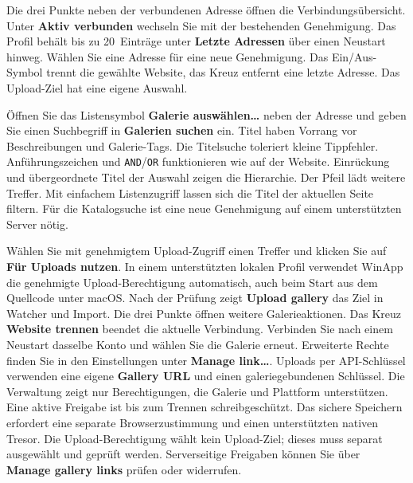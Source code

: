 \documentclass[11pt,a4paper]{article}
\newcommand{\ui}[1]{\textbf{#1}}
\begin{document}
Die drei Punkte neben der verbundenen Adresse öffnen die Verbindungsübersicht.
Unter \ui{Aktiv verbunden} wechseln Sie mit der bestehenden Genehmigung.
Das Profil behält bis zu 20~Einträge unter \ui{Letzte Adressen} über einen
Neustart hinweg. Wählen Sie eine Adresse für eine neue Genehmigung.
Das Ein/Aus-Symbol trennt die gewählte Website, das Kreuz entfernt eine
letzte Adresse. Das Upload-Ziel hat eine eigene Auswahl.

Öffnen Sie das Listensymbol \ui{Galerie auswählen…} neben der Adresse und geben
Sie einen Suchbegriff in \ui{Galerien suchen} ein. Titel haben Vorrang vor
Beschreibungen und Galerie-Tags. Die Titelsuche toleriert kleine Tippfehler.
Anführungszeichen und \texttt{AND}/\texttt{OR} funktionieren wie auf der
Website. Einrückung und übergeordnete Titel der Auswahl zeigen die Hierarchie.
Der Pfeil lädt weitere Treffer. Mit einfachem Listenzugriff lassen sich die
Titel der aktuellen Seite filtern. Für die Katalogsuche ist eine neue
Genehmigung auf einem unterstützten Server nötig.

Wählen Sie mit genehmigtem Upload-Zugriff einen Treffer und klicken Sie auf
\ui{Für Uploads nutzen}.
In einem unterstützten lokalen Profil verwendet WinApp die genehmigte
Upload-Berechtigung automatisch, auch beim Start aus dem Quellcode unter
macOS. Nach der Prüfung zeigt \ui{Upload gallery} das
Ziel in Watcher und Import. Die drei Punkte öffnen weitere Galerieaktionen.
Das Kreuz \ui{Website trennen} beendet die aktuelle Verbindung. Verbinden Sie
nach einem Neustart dasselbe Konto und wählen Sie die Galerie erneut. Erweiterte Rechte
finden Sie in den Einstellungen unter \ui{Manage link…}. Uploads per
API-Schlüssel verwenden eine eigene \ui{Gallery URL} und einen
galeriegebundenen Schlüssel.
Die Verwaltung zeigt nur Berechtigungen, die Galerie und Plattform
unterstützen. Eine aktive Freigabe ist bis zum Trennen schreibgeschützt.
Das sichere Speichern erfordert eine separate Browserzustimmung und einen
unterstützten nativen Tresor. Die Upload-Berechtigung wählt kein Upload-Ziel;
dieses muss separat ausgewählt und geprüft werden. Serverseitige Freigaben
können Sie über \ui{Manage gallery links} prüfen oder widerrufen.
\end{document}
